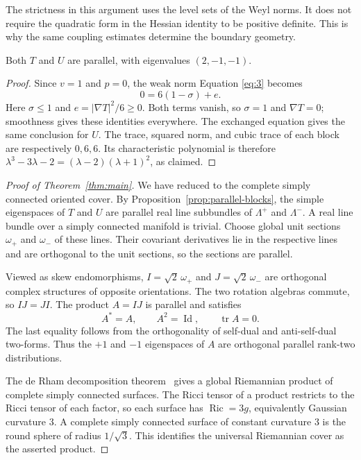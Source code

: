 The strictness in this argument uses the level sets of the Weyl norms.
It does not require the quadratic form in the Hessian identity to be
positive definite. This is why the same coupling estimates determine
the boundary geometry.

\begin{proposition}\label{prop:parallel-blocks}
Both $T$ and $U$ are parallel, with eigenvalues $(2,-1,-1)$.
\end{proposition}
\begin{proof}
Since $v=1$ and $p=0$, the weak norm Equation \eqref{eq:3} becomes
\[
 0=6(1-\sigma)+e.
\]
Here $\sigma\le1$ and $e=|\nabla T|^2/6\ge0$. Both terms vanish,
so $\sigma=1$ and $\nabla T=0$; smoothness gives these identities
everywhere. The exchanged equation gives the same conclusion for $U$.
The trace, squared norm, and cubic trace of each block are respectively
$0,6,6$. Its characteristic polynomial is therefore
$\lambda^3-3\lambda-2=(\lambda-2)(\lambda+1)^2$, as claimed.
\end{proof}

\begin{proof}[Proof of Theorem~\ref{thm:main}]
We have reduced to the complete simply connected oriented cover.
By Proposition~\ref{prop:parallel-blocks}, the simple eigenspaces of
$T$ and $U$ are parallel real line subbundles of $\Lambda^+$ and
$\Lambda^-$. A real line bundle over a simply connected manifold is
trivial. Choose global unit sections $\omega_+$ and $\omega_-$ of
these lines. Their covariant derivatives lie in the respective lines
and are orthogonal to the unit sections, so the sections are parallel.

Viewed as skew endomorphisms, $I=\sqrt2\,\omega_+$ and
$J=\sqrt2\,\omega_-$ are orthogonal complex structures of opposite
orientations. The two rotation algebras commute, so $IJ=JI$.
The product $A=IJ$ is parallel and satisfies
\[
 A^*=A,\qquad A^2=\operatorname{Id},\qquad
 \operatorname{tr}A=0.
\]
The last equality follows from the orthogonality of self-dual and
anti-self-dual two-forms. Thus the $+1$ and $-1$ eigenspaces of $A$
are orthogonal parallel rank-two distributions.

The de Rham decomposition theorem~\cite{deRham1952} gives a global
Riemannian product of complete simply connected surfaces. The Ricci
tensor of a product restricts to the Ricci tensor of each factor, so
each surface has $\operatorname{Ric}=3g$, equivalently Gaussian
curvature $3$. A complete simply connected surface of constant
curvature $3$ is the round sphere of radius $1/\sqrt3$. This identifies
the universal Riemannian cover as the asserted product.
\end{proof}

